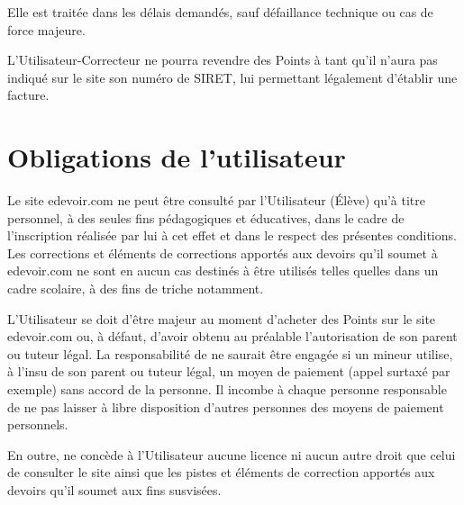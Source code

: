 Elle est traitée dans les délais demandés, sauf défaillance technique ou cas de force majeure.

L'Utilisateur-Correcteur ne pourra revendre des Points à \eDevoir tant qu'il n'aura pas indiqué sur le site son numéro de SIRET, lui permettant légalement d'établir une facture.


\section{Obligations de l'utilisateur}

Le site edevoir.com ne peut être consulté par l'Utilisateur (\'Elève) qu'à titre personnel, à des seules fins pédagogiques et éducatives, dans le cadre de l'inscription réalisée par lui à cet effet et dans le respect des présentes conditions. Les corrections et éléments de corrections apportés aux devoirs qu’il soumet à edevoir.com ne sont en aucun cas destinés à être utilisés telles quelles dans un cadre scolaire, à des fins de triche notamment.

L'Utilisateur se doit d'être majeur au moment d'acheter des Points sur le site edevoir.com ou, à défaut, d'avoir obtenu au préalable l'autorisation de son parent ou tuteur légal. La responsabilité de \eDevoir ne saurait être engagée si un mineur utilise, à l'insu de son parent ou tuteur légal, un moyen de paiement (appel surtaxé par exemple) sans accord de la personne. Il incombe à chaque personne responsable de ne pas laisser à libre disposition d'autres personnes des moyens de paiement personnels.

En outre, \eDevoir ne concède à l'Utilisateur aucune licence ni aucun autre droit que celui de consulter le site ainsi que les pistes et éléments de correction apportés aux devoirs qu'il soumet aux fins susvisées.

